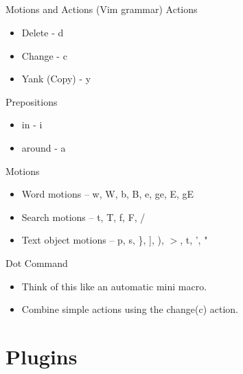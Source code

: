 \documentclass{beamer}
\begin{document}
    \subsection{}
    \begin{frame}{Motions and Actions (Vim grammar)}
        Actions
        \begin{itemize}
            \item Delete - d
            \item Change - c
            \item Yank (Copy) - y
        \end{itemize}
        Prepositions
        \begin{itemize}
            \item in - i
            \item around - a
        \end{itemize}
        Motions
        \begin{itemize}
            \item Word motions -- w, W, b, B, e, ge, E, gE
            \item Search motions -- t, T, f, F, /
            \item Text object motions -- p, s, \}, ], ), $>$, t, ', "
        \end{itemize}
    \end{frame}
    \begin{frame}{Dot Command}
        \begin{itemize}
            \item Think of this like an automatic mini macro.
            \item Combine simple actions using the change(c) action.
        \end{itemize}
    \end{frame}
    \section{Plugins}
\end{document}
